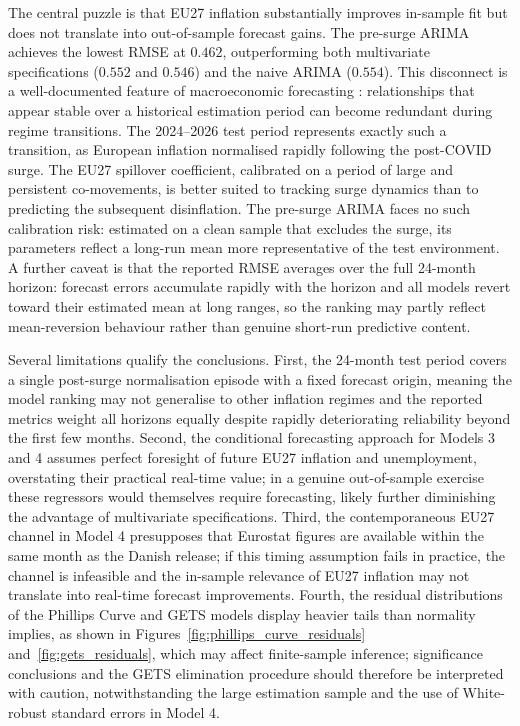 The central puzzle is that EU27 inflation substantially improves in-sample fit but does not translate into out-of-sample forecast gains. The pre-surge ARIMA achieves the lowest RMSE at $0.462$, outperforming both multivariate specifications ($0.552$ and $0.546$) and the naive ARIMA ($0.554$). This disconnect is a well-documented feature of macroeconomic forecasting \parencite{stock_watson_2008}: relationships that appear stable over a historical estimation period can become redundant during regime transitions. The 2024--2026 test period represents exactly such a transition, as European inflation normalised rapidly following the post-COVID surge. The EU27 spillover coefficient, calibrated on a period of large and persistent co-movements, is better suited to tracking surge dynamics than to predicting the subsequent disinflation. The pre-surge ARIMA faces no such calibration risk: estimated on a clean sample that excludes the surge, its parameters 
reflect a long-run mean more representative of the test environment. A further caveat is that the reported RMSE averages over the full 24-month horizon: forecast errors accumulate rapidly with the horizon and all models revert toward their estimated mean at long ranges, so the ranking may partly reflect mean-reversion behaviour rather than genuine short-run predictive  content.

Several limitations qualify the conclusions. First, the 24-month test period covers a single post-surge normalisation episode with a fixed forecast origin, meaning the model ranking may not generalise to other inflation regimes and the reported metrics weight all horizons equally despite rapidly deteriorating reliability beyond the first few months. Second, the conditional forecasting approach for Models 3 and 4 assumes perfect foresight of future EU27 inflation and unemployment, overstating their practical real-time value; in a genuine out-of-sample exercise these regressors would themselves require forecasting, likely further diminishing the advantage of multivariate specifications. Third, the contemporaneous EU27 channel in Model 4 presupposes that Eurostat figures are available within the same month as the Danish release; if this timing assumption fails in practice, the channel is infeasible and the in-sample relevance of EU27 inflation may not translate into real-time forecast improvements. Fourth, the residual distributions of the Phillips Curve and GETS models display heavier tails than normality implies, as shown in Figures~\ref{fig:phillips_curve_residuals} and~\ref{fig:gets_residuals}, which may affect finite-sample inference; significance conclusions and the GETS elimination procedure should therefore be interpreted with caution, notwithstanding the large estimation sample and the use of White-robust standard errors in Model 4.